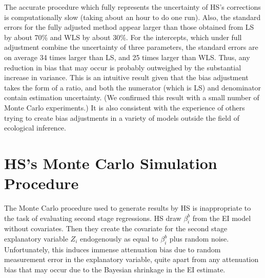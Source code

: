 \documentclass[11pt,titlepage]{article}
\begin{document}
The accurate procedure which fully represents the uncertainty of HS's
corrections is computationally slow (taking about an hour to do one
run).  Also, the standard errors for the fully adjusted method appear
larger than those obtained from LS by about 70\% and WLS by about
30\%.  For the intercepts, which under full adjustment combine the
uncertainty of three parameters, the standard errors are on average 34
times larger than LS, and 25 times larger than WLS.  Thus, any
reduction in bias that may occur is probably outweighed by the
substantial increase in variance.  This is an intuitive result given
that the bias adjustment takes the form of a ratio, and both the
numerator (which is LS) and denominator contain estimation
uncertainty.  (We confirmed this result with a small number of Monte
Carlo experiments.)  It is also consistent with the experience of
others trying to create bias adjustments in a variety of models
outside the field of ecological inference.

\section{HS's Monte Carlo Simulation Procedure}

The Monte Carlo procedure used to generate results by HS is
inappropriate to the task of evaluating second stage regressions.  HS
draw $\beta_i^b$ from the EI model without covariates.  Then they
create the covariate for the second stage explanatory variable $Z_i$
endogenously as equal to $\beta_i^b$ plus random noise.
Unfortunately, this induces immense attenuation bias due to random
measurement error in the explanatory variable, quite apart from any
attenuation bias that may occur due to the Bayesian shrinkage in the
EI estimate.
\end{document}
